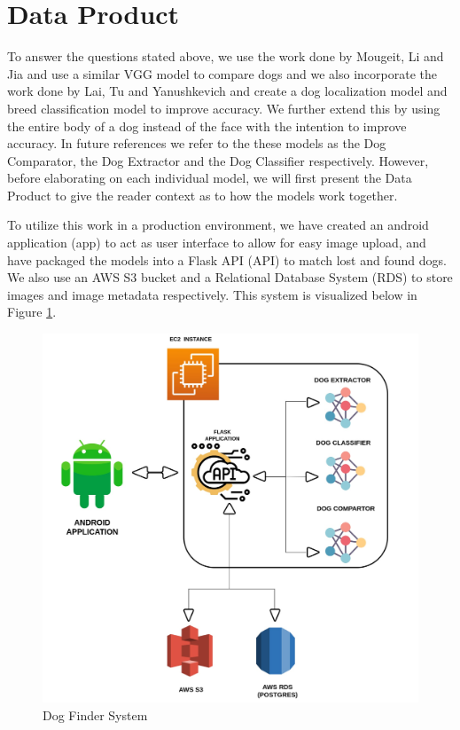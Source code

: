 \documentclass{article}
\begin{document}
\section{Data Product}

	To answer the questions stated above, we use the work done by Mougeit, Li and Jia and use a similar VGG model to compare dogs and we also incorporate the work done by Lai, Tu and Yanushkevich and create a dog localization model and breed classification model to improve accuracy.   We further extend this by using the entire body of a dog instead of the face with the intention to improve accuracy.  In future references we refer to the these models as the Dog Comparator, the Dog Extractor and the Dog Classifier respectively.  However, before elaborating on each individual model, we will first present the Data Product to give the reader context as to how the models work together.

	To utilize this work in a production environment, we have created an android application (app) to act as user interface to allow for easy image upload, and have packaged the models into a Flask API (API) to match lost and found dogs. We also use an AWS S3 bucket and a Relational Database System (RDS) to store images and image metadata respectively.  This system is visualized below in Figure \ref{fig:x app system}.

\begin{figure}[h]
\centering
	\includegraphics[scale=0.1]{final-report-images/system.jpeg}
\caption{Dog Finder System}
\label{fig:x app system}
\end{figure}
\end{document}
